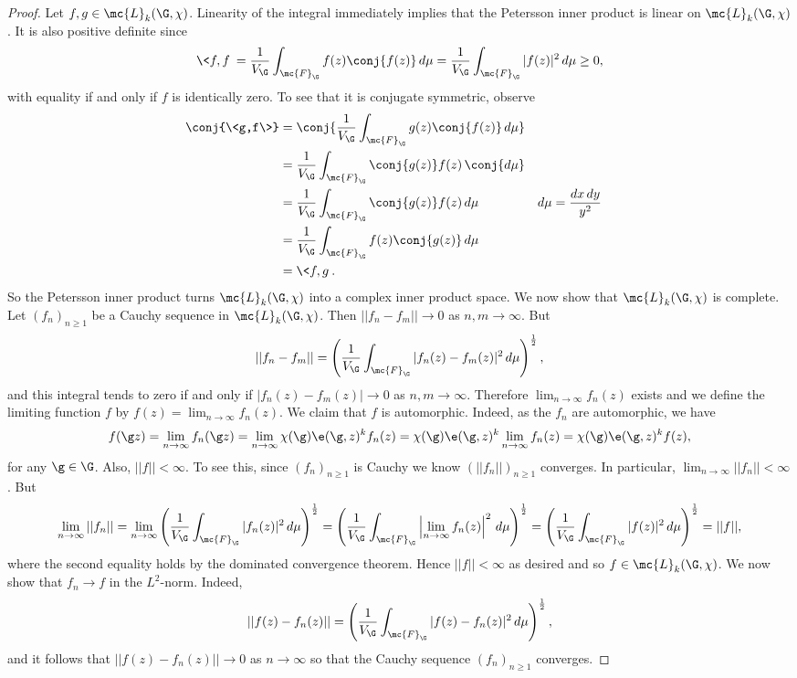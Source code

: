     \begin{proof}
      Let $f,g \in \mc{L}_{k}(\G,\chi)$. Linearity of the integral immediately implies that the Petersson inner product is linear on $\mc{L}_{k}(\G,\chi)$. It is also positive definite since
      \[
        \<f,f\> = \frac{1}{V_{\G}}\int_{\mc{F}_{\G}}f(z)\conj{f(z)}\,d\mu = \frac{1}{V_{\G}}\int_{\mc{F}_{\G}}|f(z)|^{2}\,d\mu \ge 0,
      \]
      with equality if and only if $f$ is identically zero. To see that it is conjugate symmetric, observe
      \begin{align*}
        \conj{\<g,f\>} &= \conj{\frac{1}{V_{\G}}\int_{\mc{F}_{\G}}g(z)\conj{f(z)}\,d\mu} \\
        &= \frac{1}{V_{\G}}\int_{\mc{F}_{\G}}\conj{g(z)}f(z)\,\conj{d\mu} \\
        &= \frac{1}{V_{\G}}\int_{\mc{F}_{\G}}\conj{g(z)}f(z)\,d\mu && \text{$d\mu = \frac{dx\,dy}{y^{2}}$} \\
        &= \frac{1}{V_{\G}}\int_{\mc{F}_{\G}}f(z)\conj{g(z)}\,d\mu \\
        &= \<f,g\>.
      \end{align*}
      So the Petersson inner product turns $\mc{L}_{k}(\G,\chi)$ into a complex inner product space. We now show that $\mc{L}_{k}(\G,\chi)$ is complete. Let $(f_{n})_{n \ge 1}$ be a Cauchy sequence in $\mc{L}_{k}(\G,\chi)$. Then $||f_{n}-f_{m}|| \to 0$ as $n,m \to \infty$. But
      \[
        ||f_{n}-f_{m}|| = \left(\frac{1}{V_{\G}}\int_{\mc{F}_{\G}}|f_{n}(z)-f_{m}(z)|^{2}\,d\mu\right)^{\frac{1}{2}},
      \]
      and this integral tends to zero if and only if $|f_{n}(z)-f_{m}(z)| \to 0$ as $n,m \to \infty$. Therefore $\lim_{n \to \infty}f_{n}(z)$ exists and we define the limiting function $f$ by $f(z) = \lim_{n \to \infty}f_{n}(z)$. We claim that $f$ is automorphic. Indeed, as the $f_{n}$ are automorphic, we have
      \[
        f(\g z) = \lim_{n \to \infty}f_{n}(\g z) = \lim_{n \to \infty}\chi(\g)\e(\g,z)^{k}f_{n}(z) = \chi(\g)\e(\g,z)^{k}\lim_{n \to \infty}f_{n}(z) = \chi(\g)\e(\g,z)^{k}f(z),
      \]
      for any $\g \in \G$. Also, $||f|| < \infty$. To see this, since $(f_{n})_{n \ge 1}$ is Cauchy we know $(||f_{n}||)_{n \ge 1}$ converges. In particular, $\lim_{n \to \infty}||f_{n}|| < \infty$. But
      \[
        \lim_{n \to \infty}||f_{n}|| = \lim_{n \to \infty}\left(\frac{1}{V_{\G}}\int_{\mc{F}_{\G}}|f_{n}(z)|^{2}\,d\mu\right)^{\frac{1}{2}} = \left(\frac{1}{V_{\G}}\int_{\mc{F}_{\G}}\left|\lim_{n \to \infty}f_{n}(z)\right|^{2}\,d\mu\right)^{\frac{1}{2}} = \left(\frac{1}{V_{\G}}\int_{\mc{F}_{\G}}|f(z)|^{2}\,d\mu\right)^{\frac{1}{2}} = ||f||,
      \]
      where the second equality holds by the dominated convergence theorem. Hence $||f|| < \infty$ as desired and so $f \in \mc{L}_{k}(\G,\chi)$. We now show that $f_{n} \to f$ in the $L^{2}$-norm. Indeed,
      \[
        ||f(z)-f_{n}(z)|| = \left(\frac{1}{V_{\G}}\int_{\mc{F}_{\G}}|f(z)-f_{n}(z)|^{2}\,d\mu\right)^{\frac{1}{2}},
      \]
      and it follows that $||f(z)-f_{n}(z)|| \to 0$ as $n \to \infty$ so that the Cauchy sequence $(f_{n})_{n \ge 1}$ converges.
    \end{proof}

